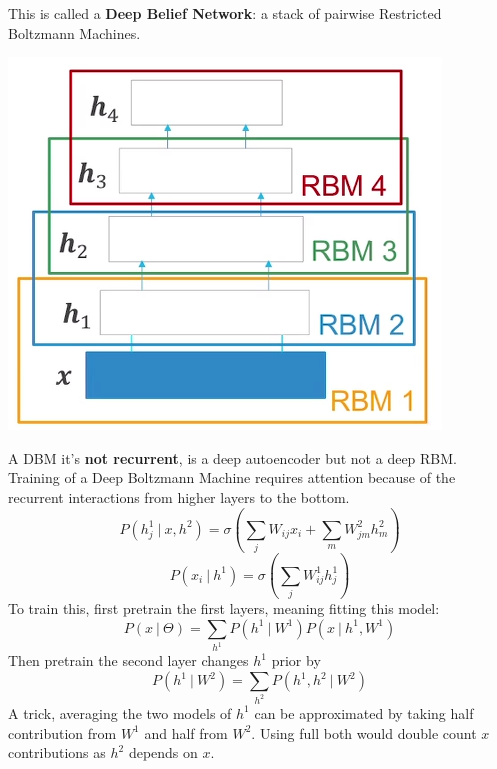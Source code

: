 \documentclass[10pt]{report}
\begin{document}
This is called a \textbf{Deep Belief Network}: a stack of pairwise Restricted Boltzmann Machines.\begin{center}
	\includegraphics[scale=0.5]{82.png}
\end{center}
A DBM it's \textbf{not recurrent}, is a deep autoencoder but not a deep RBM.\\
Training of a Deep Boltzmann Machine requires attention because of the recurrent interactions from higher layers to the bottom.
$$P(h_j^1\:|\:x,h^2)=\sigma\left(\sum_jW_{ij}x_i+\sum_m W^2_{jm}h_m^2\right)$$
$$P(x_i\:|\:h^1)=\sigma\left(\sum_jW_{ij}^1h_j^1\right)$$
To train this, first pretrain the first layers, meaning fitting this model:
$$P(x\:|\:\Theta) =\sum_{h^1}P(h^1\:|\:W^1)P(x\:|\:h^1,W^1)$$
Then pretrain the second layer changes $h^1$ prior by
$$P(h^1\:|\:W^2) = \sum_{h^2}P(h^1,h^2\:|\:W^2)$$
A trick, averaging the two models of $h^1$ can be approximated by taking half contribution from $W^1$ and half from $W^2$. Using full both would double count $x$ contributions as $h^2$ depends on $x$.
\end{document}

